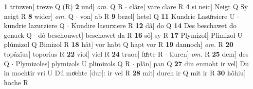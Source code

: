 \documentclass[8pt,a4paper,notitlepage]{article}
\begin{document}
\begin{table}[ht]
\begin{minipage}[t]{0.5\linewidth}
\textbf{1} triuwen] trewe Q (R) \textbf{2} und] \textit{om.} Q R  $\cdot$ clâre] vare clare R \textbf{4} si neic] Neigt Q Sẏ neigt R \textbf{8} wider] \textit{om.} Q  $\cdot$ von] ab R \textbf{9} bezel] hetel Q \textbf{11} Kundrie Lasuͦrsiere U  $\cdot$ kundrie lazurziere Q  $\cdot$ Kundire lasurziere R \textbf{12} dâ] do Q \textbf{14} Des beschawet do genuck Q  $\cdot$ dô beschouwet] beschowet da R \textbf{16} sô] sy R \textbf{17} Plymizol] Plimizol U plúmizol Q Bimizol R \textbf{18} hât] vor habt Q hapt vor R \textbf{19} dannoch] \textit{om.} R \textbf{20} topâzîus] toporius R \textbf{22} vîol] viel R \textbf{24} truoc] fuͦrte R  $\cdot$ tiuren] \textit{om.} R \textbf{25} dem] des Q  $\cdot$ Plymizoles] plymizols U plimizols Q R  $\cdot$ plân] pan Q \textbf{27} diu enmoht ir vel] Du in mochtir vri U Dú moͯchte [dur]: ir vel R \textbf{28} mit] durch ir Q mit ir R \textbf{30} hôhiu] hoche R \newline
\end{minipage}
\end{table}
\end{document}
